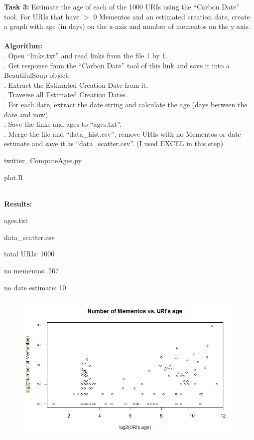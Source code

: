 \documentclass{article}
\begin{document}
		\noindent
		\textbf{Task 3: }Estimate the age of each of the 1000 URIs using the ``Carbon Date'' tool. For URIs that have $>$ 0 Mementos and an estimated creation date, create a graph with age (in days) on the x-axis and number of mementos on the y-axis.
\\\\
		\textbf{Algorithm:}\\
		. Open ``links.txt'' and read links from the file 1 by 1.\\
		. Get response from the ``Carbon Date'' tool of this link and save it into a BeautifulSoup object.\\
		. Extract the Estimated Creation Date from it.\\
		. Traverse all Estimated Creation Dates.\\
		. For each date, extract the date string and calculate the age (days between the date and now).\\
		. Save the links and ages to ``ages.txt''.\\
		. Merge the file and ``data\_hist.csv'', remove URIs with no Mementos or date estimate and save it as ``data\_scatter.csv''. (I used EXCEL in this step)
		\begin{list}{\textbf{Source code:}}
			\item twitter\_ComputeAges.py
		\end{list}
		\begin{list}{\textbf{R code:}}
			\item plot.R
		\end{list}
		\noindent
		\textbf{\\Results:}
		\begin{list}{}
			\item ages.txt
			\item data\_scatter.csv
			\item total URIs: 1000
			\item no mementos: 567
			\item  no date estimate: 10
		\end{list}
		\begin{figure}[h]
			\centering 
			\includegraphics[width=1\textwidth]{Mementos_vs_age.png}
			\label{fig:scatter} 
		\end{figure}
	
\end{document}

